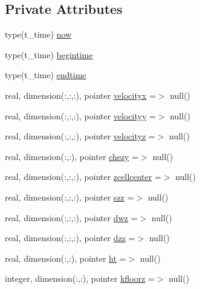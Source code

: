 \subsection*{Private Attributes}
\begin{DoxyCompactItemize}
\item 
type(t\+\_\+time) \mbox{\hyperlink{structmoduleturbulence_1_1t__external_a6b321c67dcc78f2377ad64d1aff67b9d}{now}}
\item 
type(t\+\_\+time) \mbox{\hyperlink{structmoduleturbulence_1_1t__external_a8ca74849647aa827be4bec92a9d96e7a}{begintime}}
\item 
type(t\+\_\+time) \mbox{\hyperlink{structmoduleturbulence_1_1t__external_ab57327ab1c37e30dd5947d595265ccfe}{endtime}}
\item 
real, dimension(\+:,\+:,\+:), pointer \mbox{\hyperlink{structmoduleturbulence_1_1t__external_a989ae003028ca74d58a0d8faa16bba15}{velocityx}} =$>$ null()
\item 
real, dimension(\+:,\+:,\+:), pointer \mbox{\hyperlink{structmoduleturbulence_1_1t__external_a1f65f4419f0eb443ee25a6de6bea3beb}{velocityy}} =$>$ null()
\item 
real, dimension(\+:,\+:,\+:), pointer \mbox{\hyperlink{structmoduleturbulence_1_1t__external_af11d54aeef00035d464165efde3ab10e}{velocityz}} =$>$ null()
\item 
real, dimension(\+:,\+:), pointer \mbox{\hyperlink{structmoduleturbulence_1_1t__external_ae3d188c982f639a924c764526f6452b1}{chezy}} =$>$ null()
\item 
real, dimension(\+:,\+:,\+:), pointer \mbox{\hyperlink{structmoduleturbulence_1_1t__external_a0b3fb5c1b51d4919326da4e190a6b24b}{zcellcenter}} =$>$ null()
\item 
real, dimension(\+:,\+:,\+:), pointer \mbox{\hyperlink{structmoduleturbulence_1_1t__external_ac3bb1cea20f6284cef7649a68d623b7e}{szz}} =$>$ null()
\item 
real, dimension(\+:,\+:,\+:), pointer \mbox{\hyperlink{structmoduleturbulence_1_1t__external_a2e25d508cac60812184ee1610678ebf7}{dwz}} =$>$ null()
\item 
real, dimension(\+:,\+:,\+:), pointer \mbox{\hyperlink{structmoduleturbulence_1_1t__external_aa98c0a9253ceb780fe917ac69792ef3b}{dzz}} =$>$ null()
\item 
real, dimension(\+:,\+:), pointer \mbox{\hyperlink{structmoduleturbulence_1_1t__external_af9638996ffaae2e95d763853c4412f4a}{ht}} =$>$ null()
\item 
integer, dimension(\+:,\+:), pointer \mbox{\hyperlink{structmoduleturbulence_1_1t__external_aa6ec6ac693412c13bfd481f863084ed1}{kfloorz}} =$>$ null()

\end{DoxyCompactItemize}
